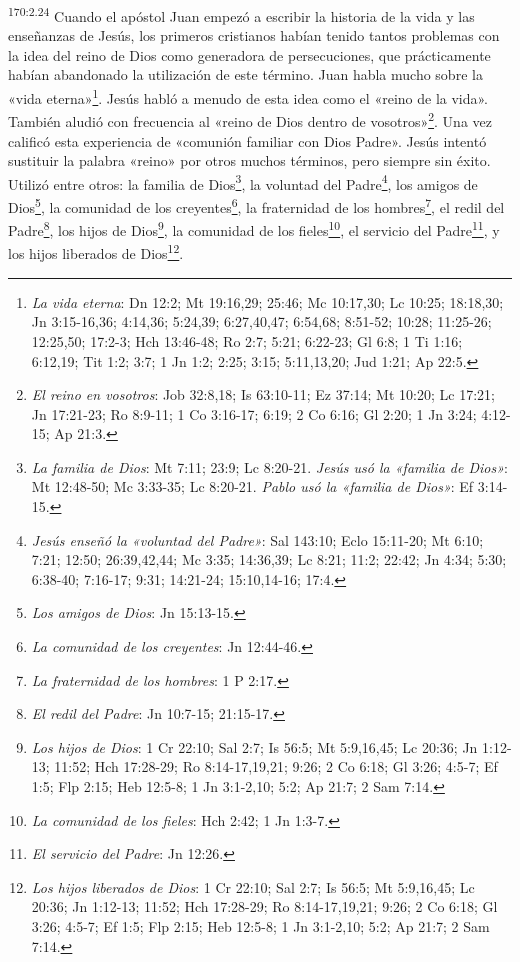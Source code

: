 \par
\textsuperscript{170:2.24} Cuando el apóstol Juan empezó a escribir la historia de la vida y las enseñanzas de Jesús, los primeros cristianos habían tenido tantos problemas con la idea del reino de Dios como generadora de persecuciones, que prácticamente habían abandonado la utilización de este término. Juan habla mucho sobre la «vida eterna»\footnote{\textit{La vida eterna}: Dn 12:2; Mt 19:16,29; 25:46; Mc 10:17,30; Lc 10:25; 18:18,30; Jn 3:15-16,36; 4:14,36; 5:24,39; 6:27,40,47; 6:54,68; 8:51-52; 10:28; 11:25-26; 12:25,50; 17:2-3; Hch 13:46-48; Ro 2:7; 5:21; 6:22-23; Gl 6:8; 1 Ti 1:16; 6:12,19; Tit 1:2; 3:7; 1 Jn 1:2; 2:25; 3:15; 5:11,13,20; Jud 1:21; Ap 22:5.}. Jesús habló a menudo de esta idea como el «reino de la vida». También aludió con frecuencia al «reino de Dios dentro de vosotros»\footnote{\textit{El reino en vosotros}: Job 32:8,18; Is 63:10-11; Ez 37:14; Mt 10:20; Lc 17:21; Jn 17:21-23; Ro 8:9-11; 1 Co 3:16-17; 6:19; 2 Co 6:16; Gl 2:20; 1 Jn 3:24; 4:12-15; Ap 21:3.}. Una vez calificó esta experiencia de «comunión familiar con Dios Padre». Jesús intentó sustituir la palabra «reino» por otros muchos términos, pero siempre sin éxito. Utilizó entre otros: la familia de Dios\footnote{\textit{La familia de Dios}: Mt 7:11; 23:9; Lc 8:20-21. \textit{Jesús usó la «familia de Dios»}: Mt 12:48-50; Mc 3:33-35; Lc 8:20-21. \textit{Pablo usó la «familia de Dios»}: Ef 3:14-15.}, la voluntad del Padre\footnote{\textit{Jesús enseñó la «voluntad del Padre»}: Sal 143:10; Eclo 15:11-20; Mt 6:10; 7:21; 12:50; 26:39,42,44; Mc 3:35; 14:36,39; Lc 8:21; 11:2; 22:42; Jn 4:34; 5:30; 6:38-40; 7:16-17; 9:31; 14:21-24; 15:10,14-16; 17:4.}, los amigos de Dios\footnote{\textit{Los amigos de Dios}: Jn 15:13-15.}, la comunidad de los creyentes\footnote{\textit{La comunidad de los creyentes}: Jn 12:44-46.}, la fraternidad de los hombres\footnote{\textit{La fraternidad de los hombres}: 1 P 2:17.}, el redil del Padre\footnote{\textit{El redil del Padre}: Jn 10:7-15; 21:15-17.}, los hijos de Dios\footnote{\textit{Los hijos de Dios}: 1 Cr 22:10; Sal 2:7; Is 56:5; Mt 5:9,16,45; Lc 20:36; Jn 1:12-13; 11:52; Hch 17:28-29; Ro 8:14-17,19,21; 9:26; 2 Co 6:18; Gl 3:26; 4:5-7; Ef 1:5; Flp 2:15; Heb 12:5-8; 1 Jn 3:1-2,10; 5:2; Ap 21:7; 2 Sam 7:14.}, la comunidad de los fieles\footnote{\textit{La comunidad de los fieles}: Hch 2:42; 1 Jn 1:3-7.}, el servicio del Padre\footnote{\textit{El servicio del Padre}: Jn 12:26.}, y los hijos liberados de Dios\footnote{\textit{Los hijos liberados de Dios}: 1 Cr 22:10; Sal 2:7; Is 56:5; Mt 5:9,16,45; Lc 20:36; Jn 1:12-13; 11:52; Hch 17:28-29; Ro 8:14-17,19,21; 9:26; 2 Co 6:18; Gl 3:26; 4:5-7; Ef 1:5; Flp 2:15; Heb 12:5-8; 1 Jn 3:1-2,10; 5:2; Ap 21:7; 2 Sam 7:14.}.

